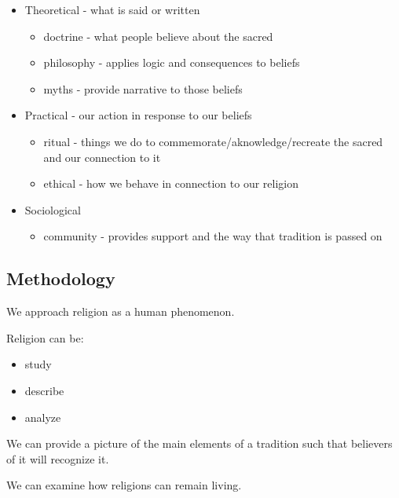 \documentclass{article}
\begin{document}
\begin{itemize}
 	\item Theoretical - what is said or written
 	\begin{itemize}
 		\item doctrine - what people believe about the sacred
 		\item philosophy - applies logic and consequences to beliefs
 		\item myths - provide narrative to those beliefs
 	\end{itemize}
 	\item Practical - our action in response to our beliefs
 	\begin{itemize}
 		\item ritual - things we do to commemorate/aknowledge/recreate the sacred and our connection to it
 		\item ethical - how we behave in connection to our religion
 	\end{itemize}
 	\item Sociological
 	\begin{itemize}
 	 	\item community - provides support and the way that tradition is passed on
 	 \end{itemize} 
\end{itemize}

\subsection*{Methodology}
\label{sub:methodology}
We approach religion as a human phenomenon.

Religion can be:
\begin{itemize}
	\item study
	\item describe
	\item analyze
\end{itemize}

We can provide a picture of the main elements of a tradition such that believers of it will recognize it.

We can examine how religions can remain living.
\end{document}
